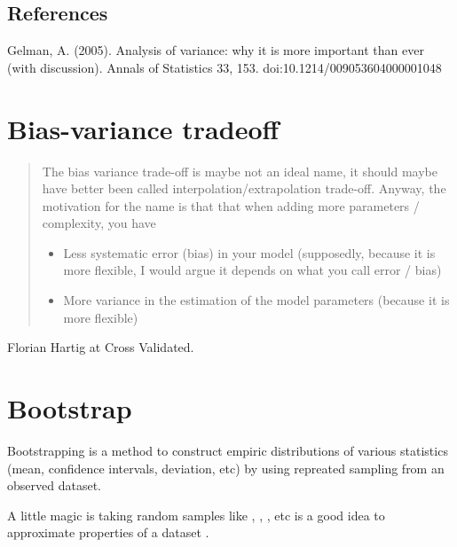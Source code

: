 \documentclass[letterpaper,10pt,english]{sphinxmanual}
\begin{document}
\section{References}
\label{\detokenize{topics/anova:references}}
Gelman, A. (2005). Analysis of variance: why it is more important than ever (with discussion). Annals of Statistics 33, 1\textendash{}53. doi:10.1214/009053604000001048


\chapter{Bias-variance tradeoff}
\label{\detokenize{topics/bias_variance_tradeoff:bias-variance-tradeoff}}\label{\detokenize{topics/bias_variance_tradeoff::doc}}
\begin{quote}

The bias variance trade-off is maybe not an ideal name, it should maybe have better been called interpolation/extrapolation trade-off. Anyway, the motivation for the name is that that when adding more parameters / complexity, you have
\begin{itemize}
\item {} 
Less systematic error (bias) in your model (supposedly, because it is more flexible, I would argue it depends on what you call error / bias)

\item {} 
More variance in the estimation of the model parameters (because it is more flexible)

\end{itemize}
\end{quote}

Florian Hartig at Cross Validated. 


\chapter{Bootstrap}
\label{\detokenize{topics/bootstrap:bootstrap}}\label{\detokenize{topics/bootstrap::doc}}
Bootstrapping is a method to construct empiric distributions of various
statistics (mean, confidence intervals, deviation, etc) by using repreated
sampling from an observed dataset.

A little magic is  taking random samples
like \sphinxcode{\sphinxupquote{{[}1,1,2{]}}}, \sphinxcode{\sphinxupquote{{[}3,2,2{]}}}, \sphinxcode{\sphinxupquote{{[}2,1,3{]}}}, etc is a good idea to approximate
properties of a dataset \sphinxcode{\sphinxupquote{{[}1,2,3{]}}}.
\end{document}

